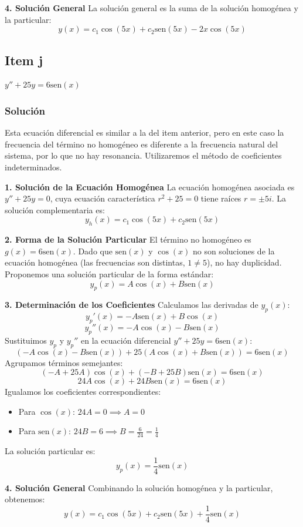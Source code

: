 \documentclass[a4paper]{article}
\begin{document}
\textbf{4. Solución General}
La solución general es la suma de la solución homogénea y la particular:
$$
y(x) = c_1 \cos(5x) + c_2 \text{sen}(5x) - 2x \cos(5x)
$$

\subsection{Item j}
$y'' + 25y = 6\text{sen}(x)$

\subsubsection{Solución}
Esta ecuación diferencial es similar a la del item anterior, pero en este caso la frecuencia del término no homogéneo es diferente a la frecuencia natural del sistema, por lo que no hay resonancia. Utilizaremos el método de coeficientes indeterminados.

\textbf{1. Solución de la Ecuación Homogénea}
La ecuación homogénea asociada es $y'' + 25y = 0$, cuya ecuación característica $r^2 + 25 = 0$ tiene raíces $r = \pm 5i$. La solución complementaria es:
$$
y_h(x) = c_1 \cos(5x) + c_2 \text{sen}(5x)
$$

\textbf{2. Forma de la Solución Particular}
El término no homogéneo es $g(x) = 6\text{sen}(x)$. Dado que $\text{sen}(x)$ y $\cos(x)$ no son soluciones de la ecuación homogénea (las frecuencias son distintas, $1 \neq 5$), no hay duplicidad. Proponemos una solución particular de la forma estándar:
$$
y_p(x) = A \cos(x) + B \text{sen}(x)
$$

\textbf{3. Determinación de los Coeficientes}
Calculamos las derivadas de $y_p(x)$:
$$
y_p'(x) = -A \text{sen}(x) + B \cos(x)
$$
$$
y_p''(x) = -A \cos(x) - B \text{sen}(x)
$$
Sustituimos $y_p$ y $y_p''$ en la ecuación diferencial $y'' + 25y = 6\text{sen}(x)$:
$$
(-A \cos(x) - B \text{sen}(x)) + 25(A \cos(x) + B \text{sen}(x)) = 6\text{sen}(x)
$$
Agrupamos términos semejantes:
$$
(-A + 25A) \cos(x) + (-B + 25B) \text{sen}(x) = 6\text{sen}(x)
$$
$$
24A \cos(x) + 24B \text{sen}(x) = 6\text{sen}(x)
$$
Igualamos los coeficientes correspondientes:
\begin{itemize}
    \item Para $\cos(x)$: $24A = 0 \implies A = 0$
    \item Para $\text{sen}(x)$: $24B = 6 \implies B = \frac{6}{24} = \frac{1}{4}$
\end{itemize}
La solución particular es:
$$
y_p(x) = \frac{1}{4} \text{sen}(x)
$$

\textbf{4. Solución General}
Combinando la solución homogénea y la particular, obtenemos:
$$
y(x) = c_1 \cos(5x) + c_2 \text{sen}(5x) + \frac{1}{4} \text{sen}(x)
$$
\end{document}
